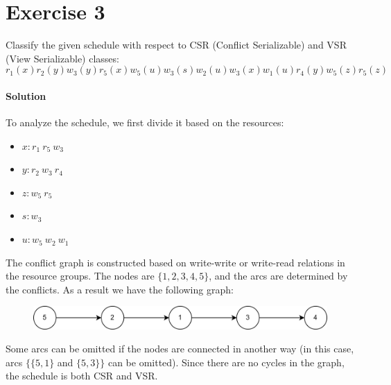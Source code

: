 \section{Exercise 3}

Classify the given schedule with respect to CSR (Conflict Serializable) and VSR (View Serializable) classes:
\[r_1(x) r_2(y) w_3(y) r_5(x) w_5(u) w_3(s)w_2(u) w_3(x) w_1(u) r_4(y) w_5(z) r_5(z)\]

\paragraph*{Solution}
To analyze the schedule, we first divide it based on the resources:
\begin{itemize}
    \item $x: r_1 \: r_5 \:w_3$
    \item $y: r_2 \: w_3 \:r_4$
    \item $z: w_5 \: r_5$
    \item $s: w_3$
    \item $u: w_5 \: w_2 \:w_1$
\end{itemize}
The conflict graph is constructed based on write-write or write-read relations in the resource groups. 
The nodes are $\{1,2,3,4,5\}$, and the arcs are determined by the conflicts. 
As a result we have the following graph:
\begin{figure}[H]
    \centering
    \includegraphics[width=1.0\linewidth]{images/conflictgraph.png}
\end{figure}
Some arcs can be omitted if the nodes are connected in another way (in this case, arcs $\{\{5,1\}$ and $\{5,3\}\}$ can be omitted).
Since there are no cycles in the graph, the schedule is both CSR and VSR.